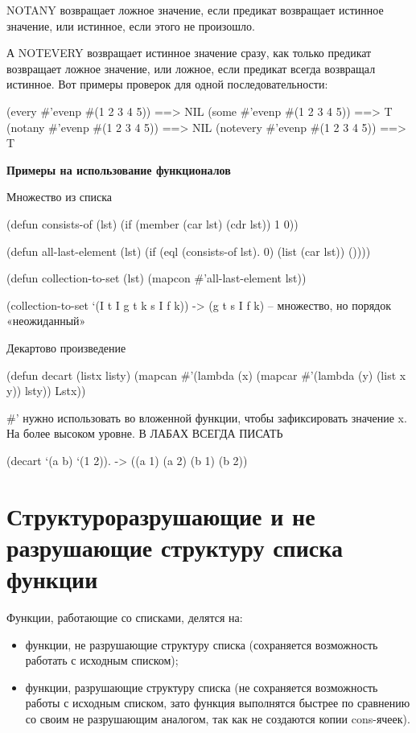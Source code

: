 \documentclass[12pt]{report}
\begin{document}
NOTANY возвращает ложное значение, если предикат возвращает истинное значение, или истинное, если этого не произошло.

А NOTEVERY возвращает истинное значение сразу, как только предикат возвращает ложное значение, или ложное, если предикат всегда возвращал истинное. Вот примеры проверок для одной последовательности:

(every \#'evenp \#(1 2 3 4 5)) ==> NIL
(some \#'evenp \#(1 2 3 4 5)) ==> T
(notany \#'evenp \#(1 2 3 4 5)) ==> NIL
(notevery \#'evenp \#(1 2 3 4 5)) ==> T



\textbf{Примеры на использование функционалов}

Множество из списка

(defun consists-of (lst) (if (member (car lst) (cdr lst)) 1 0))

(defun all-last-element (lst)
(if (eql (consists-of lst). 0) (list (car lst)) ())))

(defun collection-to-set (lst)
(mapcon \#’all-last-element lst))

(collection-to-set ‘(I t I g t k s I f k)) -> (g t s I f k) – множество, но порядок «неожиданный»


Декартово произведение

(defun decart (listx listy) 
(mapcan \#’(lambda (x)
(mapcar \#’(lambda (y)
(list x y)) lsty))
Lstx))

\#’ нужно использовать во вложенной функции, чтобы зафиксировать значение x. На более высоком уровне. В ЛАБАХ ВСЕГДА ПИСАТЬ

(decart ‘(a b) ‘(1 2)). -> ((a 1) (a 2) (b 1) (b 2))



\section*{Структуроразрушающие и не разрушающие структуру списка функции}

Функции, работающие со списками, делятся на:
\begin{itemize}
	\item функции, не разрушающие структуру списка (сохраняется возможность работать с исходным списком);
	\item функции, разрушающие структуру списка (не сохраняется возможность работы с исходным списком, зато функция выполнятся быстрее по сравнению со своим не разрушающим аналогом, так как не создаются копии cons-ячеек).
\end{itemize}
\end{document}
